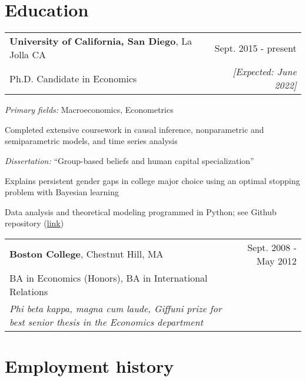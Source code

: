 \documentclass[10pt]{article}
\newcommand{\mysep}{\vspace{4pt}}
\begin{document}
 

\section*{Education}

\begin{tabularx}{\textwidth}{LR}
\textbf{University of California, San Diego}, La Jolla CA & Sept. 2015 - present
\\
Ph.D. Candidate in Economics & \emph{[Expected: June 2022]}
\end{tabularx} 
\emph{Primary fields:} Macroeconomics, Econometrics
\begin{blist}
\item Completed extensive coursework in causal inference, nonparametric and semiparametric models, and time series analysis 
\end{blist}
\emph{Dissertation:} ``Group-based beliefs and human capital specialization''
\begin{blist}
\item 
Explains persistent gender gaps in college major choice using an optimal stopping problem with Bayesian learning
\item Data analysis and theoretical modeling programmed in Python; see Github repository (\href{https://github.com/tara-sullivan/hcs}{link})
\end{blist}


\mysep{}
\begin{tabularx}{\textwidth}{@{}Xr@{}}
\textbf{Boston College}, Chestnut Hill, MA & Sept. 2008 - May 2012 \\
BA in Economics (Honors), BA in International Relations
\\
\emph{Phi beta kappa, magna cum laude, Giffuni prize for best senior thesis in the Economics department}
\end{tabularx}

\mysep{}
\section*{Employment history}
\end{document}
